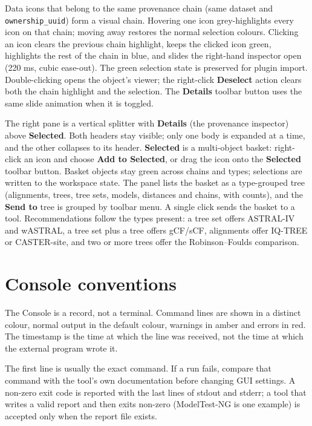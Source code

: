 \documentclass[10pt]{report}
\begin{document}
Data icons that belong to the same provenance chain (same dataset and
\texttt{ownership\_uuid}) form a visual chain. Hovering one icon
grey-highlights every icon on that chain; moving away restores the normal
selection colours. Clicking an icon clears the previous chain highlight, keeps
the clicked icon green, highlights the rest of the chain in blue, and slides
the right-hand inspector open (220 ms, cubic ease-out). The green selection
state is preserved for plugin import. Double-clicking opens the object's
viewer; the right-click \textbf{Deselect} action clears both the chain
highlight and the selection. The \textbf{Details} toolbar button uses the same
slide animation when it is toggled.

The right pane is a vertical splitter with \textbf{Details} (the provenance
inspector) above \textbf{Selected}. Both headers stay visible; only one body is
expanded at a time, and the other collapses to its header. \textbf{Selected} is
a multi-object basket: right-click an icon and choose \textbf{Add to Selected},
or drag the icon onto the \textbf{Selected} toolbar button. Basket objects stay
green across chains and types; selections are written to the workspace state.
The panel lists the basket as a type-grouped tree (alignments, trees, tree
sets, models, distances and chains, with counts), and the \textbf{Send to} tree
is grouped by toolbar menu. A single click sends the basket to a tool.
Recommendations follow the types present: a tree set offers ASTRAL-IV and
wASTRAL, a tree set plus a tree offers gCF/sCF, alignments offer IQ-TREE or
CASTER-site, and two or more trees offer the Robinson--Foulds comparison.

\section{Console conventions}

The Console is a record, not a terminal. Command lines are shown in a distinct
colour, normal output in the default colour, warnings in amber and errors in
red. The timestamp is the time at which the line was received, not the time at
which the external program wrote it.

The first line is usually the exact command. If a run fails, compare that
command with the tool's own documentation before changing GUI settings. A
non-zero exit code is reported with the last lines of stdout and stderr; a tool
that writes a valid report and then exits non-zero (ModelTest-NG is one
example) is accepted only when the report file exists.
\end{document}
